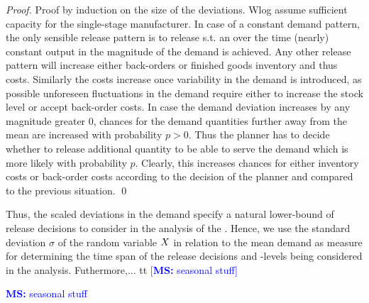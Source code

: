 \documentclass[mnsc]{informs3}
\newcommand\MS[2][r]{\ifx t#1 \textcolor{blue}{[\textbf{MS:} #2]}
  \else \begin{center}\textcolor{blue}{\textbf{MS:} #2} \end{center} \fi}
\begin{document}
\begin{proof}{Proof by induction on the size of the deviations.}
  Wlog assume sufficient capacity for the single-stage manufacturer.
  In case of a constant demand pattern, the only sensible release pattern is to release s.t. an over
  the time (nearly) constant output in the magnitude of the demand is achieved.
  Any other release pattern will increase either back-orders or finished goods inventory and thus
  costs. Similarly the costs increase once variability in the demand is introduced, as possible
  unforeseen fluctuations in the demand require either to increase the stock level or accept
  back-order costs.
  In case the demand deviation increases by any magnitude greater $0$, chances for the demand
  quantities further away from the mean are increased with probability $p>0$. Thus the planner has
  to decide whether to release additional quantity to be able to serve the demand which is more
  likely with probability $p$. Clearly, this increases chances for either inventory costs or
  back-order costs according to the decision of the planner and compared to the previous situation.
  \qed




\end{proof}


Thus, the scaled deviations in the demand specify a natural
lower-bound of release decisions to consider in the analysis of the \LTS{}.
%
Hence, we use the standard deviation $\sigma$ of the random variable $X$ in relation to the mean
demand as measure for determining the time span of the release decisions and \WIP{}-levels being
considered in the analysis.
%
%
%
%
Futhermore,... \MS[t]{seasonal stuff}
%
\end{document}
